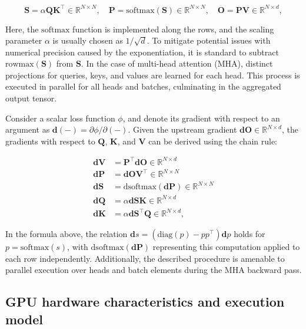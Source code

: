 \begin{equation*}
  \mathbf{S} = \alpha \mathbf{Q} \mathbf{K}^\top \in \mathbb{R}^{N \times N}, \quad \mathbf{P} = \mathrm{softmax}(\mathbf{S}) \in \mathbb{R}^{N \times N}, \quad \mathbf{O} = \mathbf{P}\mathbf{V} \in \mathbb{R}^{N \times d},
\end{equation*}

Here, the $\mathrm{softmax}$ function is implemented along the rows, and the scaling parameter $\alpha$ is usually chosen as $1/\sqrt{d}$. To mitigate potential issues with numerical precision caused by the exponentiation, it is standard to subtract $\mathrm{rowmax}(\mathbf{S})$ from $\mathbf{S}$. In the case of multi-head attention (MHA), distinct projections for queries, keys, and values are learned for each head. This process is executed in parallel for all heads and batches, culminating in the aggregated output tensor.

Consider a scalar loss function $\phi$, and denote its gradient with respect to an argument as $\mathbf{d}(-) = \partial \phi / \partial (-)$. Given the upstream gradient $\mathbf{dO} \in \mathbb{R}^{N \times d}$, the gradients with respect to $\mathbf{Q}$, $\mathbf{K}$, and $\mathbf{V}$ can be derived using the chain rule:

\begin{align*}
  \mathbf{dV} &= \mathbf{P}^\top \mathbf{dO} \in \mathbb{R}^{N \times d} \\
  \mathbf{dP} &= \mathbf{dO} \mathbf{V}^\top \in \mathbb{R}^{N \times N} \\
  \mathbf{dS} &= \mathrm{dsoftmax} (\mathbf{dP}) \in \mathbb{R}^{N \times N} \\
  \mathbf{dQ} &= \alpha \mathbf{dS} \mathbf{K} \in \mathbb{R}^{N \times d} \\
  \mathbf{dK} &= \alpha \mathbf{dS}^\top \mathbf{Q} \in \mathbb{R}^{N \times d},
\end{align*}

In the formula above, the relation $\mathbf{d}s = (\mathrm{diag}(p) - p p^\top)\mathbf{d}p$ holds for $p = \mathrm{softmax}(s)$, with $\mathrm{dsoftmax}(\mathbf{dP})$ representing this computation applied to each row independently. Additionally, the described procedure is amenable to parallel execution over heads and batch elements during the MHA backward pass.

\subsection{GPU hardware characteristics and execution model}
\label{subsec:hardware}

